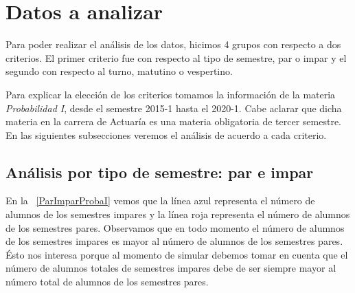\section{Datos a analizar} \label{DatosAnalizar}

Para poder realizar el análisis de los datos, hicimos 4 grupos con respecto a dos criterios. El primer criterio fue con respecto al tipo de semestre, par o impar y el segundo con respecto al turno, matutino o vespertino.

Para explicar la elección de los criterios tomamos la información de la materia \textit{Probabilidad I}, desde el semestre 2015-1 hasta el 2020-1. Cabe aclarar que dicha materia en la carrera de Actuaría es una materia obligatoria de tercer semestre. En las siguientes subsecciones veremos el análisis de acuerdo a cada criterio.

\subsection{Análisis por tipo de semestre: par e impar}

En la \figurename{~\ref{ParImparProbaI}} vemos que la línea azul representa el número de alumnos de los semestres impares y la línea roja representa el número de alumnos de los semestres pares. Observamos que en todo momento el número de alumnos de los semestres impares es mayor al número de alumnos de los semestres pares. Ésto nos interesa porque al momento de simular debemos tomar en cuenta que el número de alumnos totales de semestres impares debe de ser siempre mayor al número total de alumnos de los semestres pares.


